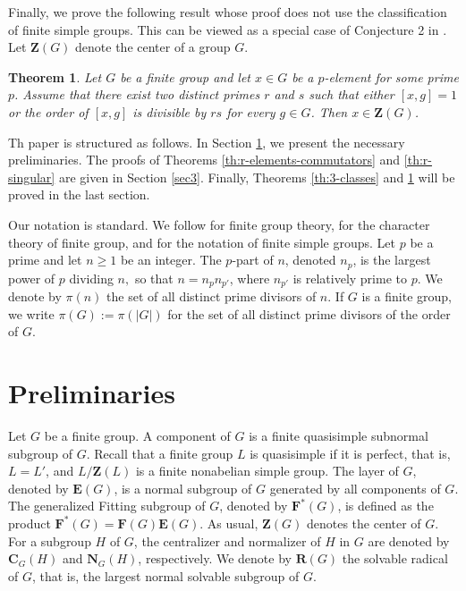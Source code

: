 \documentclass[twoside,a4paper,reqno,12pt]{amsart}
\newcommand{\<}{\langle}
\renewcommand{\>}{\rangle}
\newcommand{\CB}{\mathbf{C}}
\newcommand{\FB}{\mathbf{F}}
\newcommand{\NB}{\mathbf{N}}
\newcommand{\ZB}{\mathbf{Z}}
\newcommand{\RB}{\mathbf{R}}
\newcommand{\EB}{\mathbf{E}}
\renewcommand{\:}{\colon}
\newtheorem{thm}{Theorem}[section]
\theoremstyle{definition}
\begin{document}
Finally, we prove the following result whose proof does not use the classification of finite simple groups. This can be viewed as a special case of Conjecture 2 in \cite{GTT}. 
Let $\ZB(G)$ denote the center of a group $G$.

\begin{thm}\label{th:two-primes-divisors}
 Let $G$ be a finite group and let $x\in G$ be a $p$-element for some prime $p$. Assume that there exist two distinct primes $r$ and $s$ such that  either $[x,g]=1$ or the order of $[x,g]$ is divisible by $rs$ for every $g\in G$. Then $x\in \ZB(G)$.
\end{thm}




Th paper is  structured as  follows. In Section \ref{sec2}, we present the necessary preliminaries. The proofs of Theorems \ref{th:r-elements-commutators} and \ref{th:r-singular} are given in Section \ref{sec3}. Finally, Theorems \ref{th:3-classes} and \ref{th:two-primes-divisors} will be proved in the last section. 

\medskip

Our notation is standard. We follow \cite{Isaacs-fg} for  finite group theory, \cite{Isaacs-ct} for the character theory of finite group, and \cite{ATLAS} for the notation of finite simple groups. Let $p$ be a prime and let $n\ge 1$ be an integer. The $p$-part of $n$, denoted $n_p$, is the largest power of $p$ dividing $n,$ so that $n=n_pn_{p'}$, where $n_{p'}$ is relatively prime to $p$. We denote by $\pi(n)$ the set of all distinct prime divisors of $n.$ If $G$ is a finite group, we write $\pi(G):=\pi(|G|)$ for the set of all distinct prime divisors of the order of $G$. 

\section{Preliminaries}\label{sec2}

Let  $G$ be a finite group. A component of $G$ is a finite quasisimple subnormal subgroup of $G$. Recall that  a finite group $L$ is quasisimple if it is perfect, that is, $L=L'$, and  $L/\ZB(L)$ is a finite nonabelian simple group. The layer of $G$, denoted by $\EB(G)$, is a normal subgroup of $G$ generated by all  components of $G$.  The generalized Fitting subgroup of $G$, denoted by $\FB^*(G)$, is defined as the product $\FB^*(G)=\FB(G)\EB(G)$. As usual, $\ZB(G)$ denotes the center of $G$.  For a subgroup $H$ of $G$, the centralizer and normalizer of $H$ in $G$ are denoted by $\CB_G(H)$ and $\NB_G(H)$, respectively. We denote by $\RB(G)$ the solvable radical of $G$, that is, the largest normal solvable subgroup of $G$.  
\end{document}
